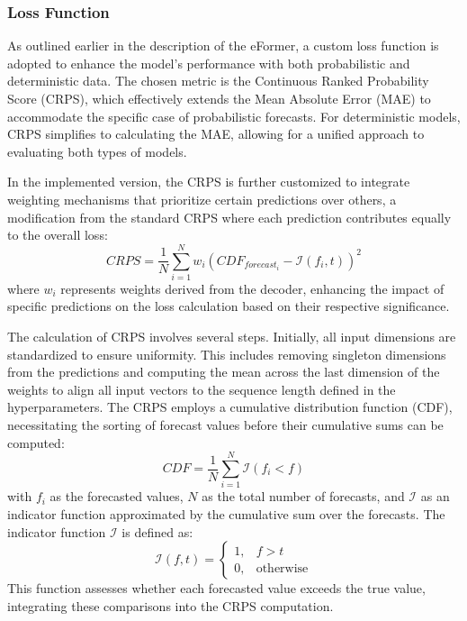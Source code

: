 \documentclass{article}
\begin{document}
\subsubsection{Loss Function}

As outlined earlier in the description of the eFormer, a custom loss function is adopted to enhance the model's performance with both probabilistic and deterministic data. The chosen metric is the Continuous Ranked Probability Score (CRPS), which effectively extends the Mean Absolute Error (MAE) to accommodate the specific case of probabilistic forecasts. For deterministic models, CRPS simplifies to calculating the MAE, allowing for a unified approach to evaluating both types of models.

In the implemented version, the CRPS is further customized to integrate weighting mechanisms that prioritize certain predictions over others, a modification from the standard CRPS where each prediction contributes equally to the overall loss:
\begin{equation}
    CRPS = \frac{1}{N} \sum^N_{i = 1} w_i (CDF_{forecast_i} - \mathcal{I}(f_i, t))^2
\end{equation}
where $w_i$ represents weights derived from the decoder, enhancing the impact of specific predictions on the loss calculation based on their respective significance.

The calculation of CRPS involves several steps. Initially, all input dimensions are standardized to ensure uniformity. This includes removing singleton dimensions from the predictions and computing the mean across the last dimension of the weights to align all input vectors to the sequence length defined in the hyperparameters. The CRPS employs a cumulative distribution function (CDF), necessitating the sorting of forecast values before their cumulative sums can be computed:
\begin{equation}
    CDF = \frac{1}{N} \sum^N_{i = 1} \mathcal{I}(f_i < f)
\end{equation}
with $f_i$ as the forecasted values, $N$ as the total number of forecasts, and $\mathcal{I}$ as an indicator function approximated by the cumulative sum over the forecasts. The indicator function $\mathcal{I}$ is defined as:
\begin{equation}
    \mathcal{I}(f, t) = \begin{cases}
        1, & f > t \\
        0, & \text{otherwise}
    \end{cases}
\end{equation}
This function assesses whether each forecasted value exceeds the true value, integrating these comparisons into the CRPS computation.
\end{document}
